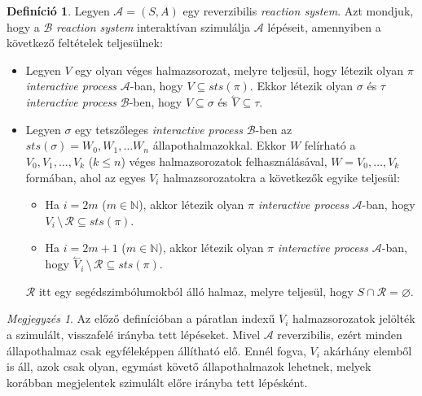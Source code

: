 \documentclass[12pt]{article}
\theoremstyle{definition}
\newtheorem*{definition*}{Definíció}
\theoremstyle{remark}
\newtheorem*{remark*}{Megjegyzés}
\theoremstyle{plain}
\theoremstyle{plain}
\let\emptyset\varnothing
\newcommand{\backwardhat}{\overset{\leftharpoonup}}
\begin{document}
    \begin{definition*}
        Legyen $\mathscr{A}=(S, A)$ egy reverzibilis \textit{reaction system}. Azt mondjuk, hogy a $\mathscr{B}$ \textit{reaction system} interaktívan szimulálja $\mathscr{A}$ lépéseit, amennyiben a következő feltételek teljesülnek:
        \begin{itemize}
            \item
            Legyen $V$ egy olyan véges halmazsorozat, melyre teljesül, hogy létezik olyan $\pi$ \textit{interactive process} $\mathscr{A}$-ban, hogy $V \subseteq \textit{sts}(\pi)$. Ekkor létezik olyan $\sigma$ és $\tau$ \textit{interactive process} $\mathscr{B}$-ben, hogy $V \subseteq \sigma$ és $\backwardhat V \subseteq \tau$.
            \item
            Legyen $\sigma$ egy tetszőleges \textit{interactive process} $\mathscr{B}$-ben az $\textit{sts}(\sigma)=W_{0},W_{1},\ldots W_{n}$ állapothalmazokkal. Ekkor $W$ felírható a $V_{0}, V_{1}, \ldots, V_{k}$ ($k \leq n$) véges halmazsorozatok felhasználásával, $W=V_{0}, \ldots, V_{k}$ formában, ahol az egyes $V_{i}$ halmazsorozatokra a következők egyike teljesül:
            \begin{itemize}
                \item
                Ha $i = 2m$ ($m \in \mathbb{N}$), akkor létezik olyan $\pi$ \textit{interactive process} $\mathscr{A}$-ban, hogy $V_{i} \,\setminus\, \mathcal{R}\subseteq \textit{sts}(\pi)$.
                \item
                Ha $i = 2m + 1$ ($m \in \mathbb{N}$), akkor létezik olyan $\pi$ \textit{interactive process} $\mathscr{A}$-ban, hogy $\backwardhat V_{i} \,\setminus\, \mathcal{R} \subseteq \textit{sts}(\pi)$.
            \end{itemize}
            $\mathcal{R}$ itt egy segédszimbólumokból álló halmaz, melyre teljesül, hogy $S \cap \mathcal{R} = \emptyset$.
        \end{itemize}
        
    \end{definition*}

    \begin{remark*}
        Az előző definícióban a páratlan indexű $V_{i}$ halmazsorozatok jelölték a szimulált, visszafelé irányba tett lépéseket. Mivel $\mathscr{A}$ reverzibilis, ezért minden állapothalmaz csak egyféleképpen állítható elő. Ennél fogva, $V_{i}$ akárhány elemből is áll, azok csak olyan, egymást követő állapothalmazok lehetnek, melyek korábban megjelentek szimulált előre irányba tett lépésként.
    \end{remark*}
\end{document}
